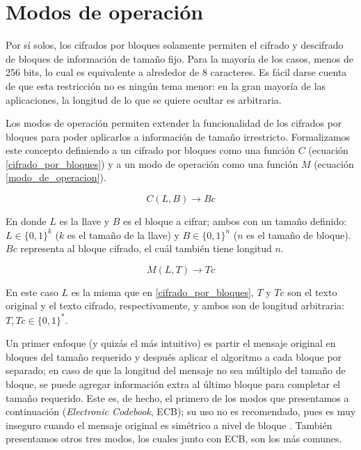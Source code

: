 %
%

\section{Modos de operación}

Por sí solos, los cifrados por bloques solamente permiten el cifrado y
descifrado de bloques de información de tamaño fijo. Para la mayoría de los
casos, menos de 256 bits\cite{modos_de_operacion}, lo cual es equivalente a
alrededor de 8 caracteres. Es fácil darse cuenta de que esta restricción no
es ningún tema menor: en la gran mayoría de las aplicaciones, la longitud de
lo que se quiere ocultar es arbitraria.

Los modos de operación permiten extender la funcionalidad de los cifrados por
bloques para poder aplicarlos a información de tamaño irrestricto. Formalizamos
este concepto definiendo a un cifrado por bloques como una función $ C $
(ecuación \ref{cifrado_por_bloques}) y a un modo de operación como una función
$ M $ (ecuación \ref{modo_de_operacion}).

\begin{equation}
  \label{cifrado_por_bloques}
  C(L, B) \rightarrow Bc
\end{equation}

En donde $ L $ es la llave y $ B $ es el bloque a cifrar; ambos con un tamaño
definido: $ L \in \{0, 1\}^k $ ($ k $ es el tamaño de la llave) y
$ B \in \{0, 1\}^n $ ($ n $ es el tamaño de bloque). $ Bc $ representa al
bloque cifrado, el cuál también tiene longitud $ n $.

\begin{equation}
  \label{modo_de_operacion}
  M(L, T) \rightarrow Tc
\end{equation}

En este caso $ L $ es la misma que en \ref{cifrado_por_bloques}, $ T $ y
$ Tc $ son el texto original y el texto cifrado, respectivamente, y ambos
son de longitud arbitraria: $ T, Tc \in \{0, 1\}^* $.

Un primer enfoque (y quizás el más intuitivo) es partir el mensaje original
en bloques del tamaño requerido y después aplicar el algoritmo a cada bloque
por separado; en caso de que la longitud del mensaje no sea múltiplo del
tamaño de bloque, se puede agregar información extra al último bloque para
completar el tamaño requerido. Este es, de hecho, el primero de los modos que
presentamos a continuación (\textit{Electronic Codebook}, ECB); su uso no es
recomendado, pues es muy inseguro cuando el mensaje original es simétrico a
nivel de bloque \cite{modos_de_operacion}. También presentamos otros tres
modos, los cuales junto con ECB, son los más comunes.


